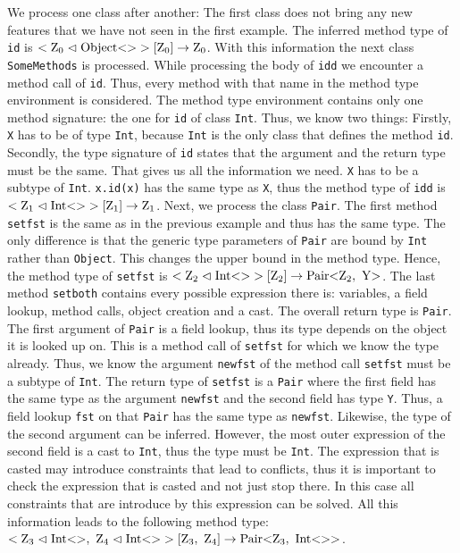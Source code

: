We process one class after another: The first class does not bring any new features that we have not seen in the first example. The inferred method type of \verb|id| is $<\text{Z}_{0} \vartriangleleft \text{Object} \text{<}  \text{>}>[\text{Z}_{0}] \to \text{Z}_{0}$.
With this information the next class \verb|SomeMethods| is processed. While processing the body of \verb|idd| we encounter a method call of \verb|id|. Thus, every method with that name in the method type environment is considered. The method type environment
contains only one method signature: the one for \verb|id| of class \verb|Int|. Thus, we know two things: Firstly, \verb|X| has to be of type \verb|Int|, because \verb|Int| is the only class that defines the method \verb|id|. Secondly, the type signature of \verb|id| states that the argument and the return type must be the same.
That gives us all the information we need. \verb|X| has to be a subtype of \verb|Int|. \verb|x.id(x)| has the same type as \verb|X|, thus the method type of \verb|idd| is $<\text{Z}_{1} \vartriangleleft \text{Int} \text{<}  \text{>}>[\text{Z}_{1}] \to \text{Z}_{1}$.
Next, we process the class \verb|Pair|. The first method \verb|setfst| is the same as in the previous example and thus has the same type. The only difference is that the generic type parameters of \verb|Pair| are bound by \verb|Int| rather than \verb|Object|.
This changes the upper bound in the method type. Hence, the method type of \verb|setfst| is $<\text{Z}_{2} \vartriangleleft \text{Int} \text{<}  \text{>}>[\text{Z}_{2}] \to \text{Pair} \text{<} \text{Z}_{2}, \ \text{Y} \text{>}$.
The last method \verb|setboth| contains every possible expression there is: variables, a field lookup, method calls, object creation and a cast.
The overall return type is \verb|Pair|. The first argument of \verb|Pair| is a field lookup, thus its type depends on the object it is looked up on. This is a method call of \verb|setfst| for which we know the type already. Thus, we know the argument \verb|newfst| of the method call \verb|setfst| must be a subtype of \verb|Int|. The return type of \verb|setfst| is a \verb|Pair| where the first field has the same type as the argument \verb|newfst| and the second field has type \verb|Y|.
Thus, a field lookup \verb|fst| on that \verb|Pair| has the same type as \verb|newfst|. Likewise, the type of the second argument can be inferred. However, the most outer expression of the second field is a cast to \verb|Int|, thus the type must be \verb|Int|.
The expression that is casted may introduce constraints that lead to conflicts, thus it is important to check the expression that is casted and not just stop there. In this case all constraints that are introduce by this expression can be solved.
All this information leads to the following method type: $<\xa{Z}{3} \vartriangleleft \nvtt{Int}{}, \ \xa{Z}{4} \vartriangleleft \nvtt{Int}{}>[\xa{Z}{3}, \ \xa{Z}{4}] \to \nvtt{Pair}{\xa{Z}{3}, \ \nvtt{Int}{}}$.
